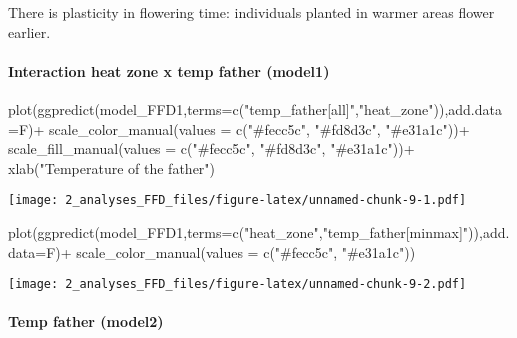 \documentclass[
]{article}
\newenvironment{Shaded}{\begin{snugshade}}{\end{snugshade}}
\newcommand{\AttributeTok}[1]{\textcolor[rgb]{0.77,0.63,0.00}{#1}}
\newcommand{\FunctionTok}[1]{\textcolor[rgb]{0.00,0.00,0.00}{#1}}
\newcommand{\NormalTok}[1]{#1}
\newcommand{\SpecialCharTok}[1]{\textcolor[rgb]{0.00,0.00,0.00}{#1}}
\newcommand{\StringTok}[1]{\textcolor[rgb]{0.31,0.60,0.02}{#1}}
\begin{document}
There is plasticity in flowering time: individuals planted in warmer
areas flower earlier.

\hypertarget{interaction-heat-zone-x-temp-father-model1}{%
\paragraph{Interaction heat zone x temp father
(model1)}\label{interaction-heat-zone-x-temp-father-model1}}

\begin{Shaded}
\begin{Highlighting}[]
\FunctionTok{plot}\NormalTok{(}\FunctionTok{ggpredict}\NormalTok{(model\_FFD1,}\AttributeTok{terms=}\FunctionTok{c}\NormalTok{(}\StringTok{"temp\_father[all]"}\NormalTok{,}\StringTok{"heat\_zone"}\NormalTok{)),}\AttributeTok{add.data=}\NormalTok{F)}\SpecialCharTok{+}
  \FunctionTok{scale\_color\_manual}\NormalTok{(}\AttributeTok{values =} \FunctionTok{c}\NormalTok{(}\StringTok{"\#fecc5c"}\NormalTok{, }\StringTok{"\#fd8d3c"}\NormalTok{, }\StringTok{"\#e31a1c"}\NormalTok{))}\SpecialCharTok{+}
  \FunctionTok{scale\_fill\_manual}\NormalTok{(}\AttributeTok{values =} \FunctionTok{c}\NormalTok{(}\StringTok{"\#fecc5c"}\NormalTok{, }\StringTok{"\#fd8d3c"}\NormalTok{, }\StringTok{"\#e31a1c"}\NormalTok{))}\SpecialCharTok{+}
  \FunctionTok{xlab}\NormalTok{(}\StringTok{"Temperature of the father"}\NormalTok{)}
\end{Highlighting}
\end{Shaded}

\texttt{[image: 2\_analyses\_FFD\_files/figure-latex/unnamed-chunk-9-1.pdf]}

\begin{Shaded}
\begin{Highlighting}[]
\FunctionTok{plot}\NormalTok{(}\FunctionTok{ggpredict}\NormalTok{(model\_FFD1,}\AttributeTok{terms=}\FunctionTok{c}\NormalTok{(}\StringTok{"heat\_zone"}\NormalTok{,}\StringTok{"temp\_father[minmax]"}\NormalTok{)),}\AttributeTok{add.data=}\NormalTok{F)}\SpecialCharTok{+}
  \FunctionTok{scale\_color\_manual}\NormalTok{(}\AttributeTok{values =} \FunctionTok{c}\NormalTok{(}\StringTok{"\#fecc5c"}\NormalTok{, }\StringTok{"\#e31a1c"}\NormalTok{))}
\end{Highlighting}
\end{Shaded}

\texttt{[image: 2\_analyses\_FFD\_files/figure-latex/unnamed-chunk-9-2.pdf]}

\hypertarget{temp-father-model2}{%
\paragraph{Temp father (model2)}\label{temp-father-model2}}
\end{document}
